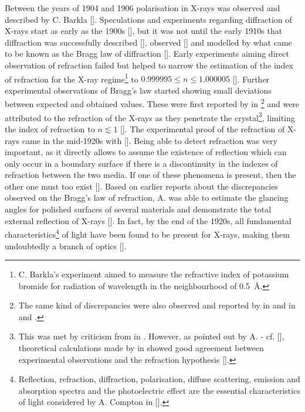 \begin{refsection}
Between the years of 1904 and 1906 polarisation in X-rays was observed and described by C. Barkla [\cite{Barkla1904, Barkla1905, Barkla1906}]. Speculations and experiments regarding diffraction of X-rays start as early as the 1900s [\cite{Haga1903,Walter1908,Walter1909}], but it was not until the early 1910s that diffraction was successfully described [\cite{Laue1912}], observed [\cite{FriedrichKnippingLaue1912}] and modelled by what came to be known as the Bragg law of diffraction [\cite{BraggW.H.1913}]. Early experiments aiming direct observation of refraction failed but helped to narrow the estimation of the index of refraction for the X-ray regime\footnote{C. Barkla's experiment aimed to measure the refractive index of potassium bromide for radiation of wavelength in the neighbourhood of 0.5~\r{A}.} to $0.999995\leq n \leq1.000005$ [\cite{Barkla1916}]. Further experimental observations of Bragg's law started showing small deviations between expected and obtained values. These were first reported by \citeauthor{Stenstrom1919} in \cite*{Stenstrom1919}\footnote{The same kind of discrepancies were also observed and reported by \citeauthor{Duane1920} in \cite*{Duane1920} and \citeauthor{Siegbahn1920} in \cite*{Siegbahn1920} and \cite*{Siegbahn1921}.} and were attributed to the refraction of the X-rays as they penetrate the crystal\footnote{This was met by criticism from \citeauthor{Knipping1920} in \cite*{Knipping1920} \citep{Knipping1920}. However, as pointed out by A. \citeauthor{Compton1923} - cf. [\cite{Compton1923}], theoretical calculations made by \citeauthor{Ewald1920} in \cite*{Ewald1920} showed good agreement between experimental observations and the refraction hypothesis [\cite{Ewald1920}].}, limiting the index of refraction to $n\lesssim1$ [\cite[\textit{§3}]{Stenstrom1919}]. The experimental proof of the refraction of X-rays came in the mid-1920s with [\cite{Larsson1924}]. Being able to detect refraction was very important, as it directly allows to assume the existence of reflection which
can only occur in a boundary surface if there is a discontinuity in the indexes of refraction between the two media. If one of these phenomena is present, then the other one must too exist [\cite{Compton1928}]. Based on earlier reports about the discrepancies observed on the Bragg's law of refraction, A. \citeauthor{Compton1923} was able to estimate the glancing angles for polished surfaces of several materials and demonstrate the total external reflection of X-rays [\cite{Compton1923,Prins1927}]. In fact, by the end of the 1920s, all fundamental characteristics\footnote{Reflection, refraction, diffraction, polarisation, diffuse scattering, emission and absorption spectra and the photoelectric effect are the essential characteristics of light considered by A. Compton in [\cite{Compton1928}].} of light have been found to be present for X-rays, making them undoubtedly a branch of optics [\cite{Compton1928}].  


\end{refsection}
